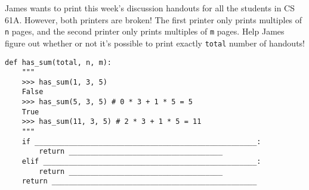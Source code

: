 \begin{blocksection}
\question James wants to print this week's discussion handouts for all the students in CS 61A.
However, both printers are broken! The first printer only prints multiples of \lstinline$n$
pages, and the second printer only prints multiples of \lstinline$m$ pages. Help James figure
out whether or not it's possible to print exactly \lstinline$total$ number of handouts! \\

\begin{lstlisting}
def has_sum(total, n, m):
    """
    >>> has_sum(1, 3, 5)
    False
    >>> has_sum(5, 3, 5) # 0 * 3 + 1 * 5 = 5
    True
    >>> has_sum(11, 3, 5) # 2 * 3 + 1 * 5 = 11
    """
    if ____________________________________________________:
        return ____________________________________
    elif __________________________________________________:
        return ____________________________________
    return ________________________________________________
    
\end{lstlisting}

\end{blocksection}
